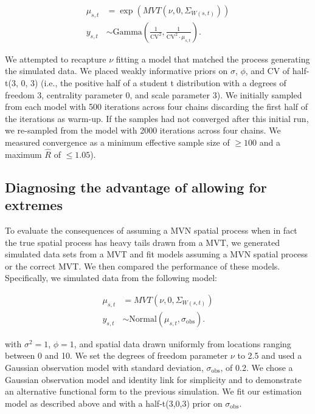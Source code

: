 \documentclass[12pt,english]{article}
\begin{document}
\begin{spacing}{1.25}
\begin{align}
  \mu_{s,t} &= \exp(MVT(\nu, 0, \Sigma_{W(s,t)}))\\
  y_{s,t} &\sim \mathrm{Gamma} \left( \frac{1}{\mathrm{CV}^2},
  \frac{1}{\mathrm{CV}^2 \cdot \mu_{s,t} } \right).
\end{align}

We attempted to recapture $\nu$ fitting a model that matched the process
generating the simulated data. We placed weakly informative priors on $\sigma$,
$\phi$, and CV of half-t(3, 0, 3) (i.e., the positive half of a student t
distribution with a degrees of freedom 3, centrality parameter 0, and scale
parameter 3). We initially sampled from each model with 500 iterations across
four chains discarding the first half of the iterations as warm-up. If the
samples had not converged after this initial run, we re-sampled from the model
with 2000 iterations across four chains. We measured convergence as a minimum
effective sample size of $\ge 100$ and a maximum $\hat{R}$ of $\le 1.05$). 

\subsection{Diagnosing the advantage of allowing for extremes}

To evaluate the consequences of assuming a MVN spatial process when in fact the
true spatial process has heavy tails drawn from a MVT, we generated simulated
data sets from a MVT and fit models assuming a MVN spatial process or the
correct MVT. We then compared the performance of these models. Specifically, we
simulated data from the following model:

\begin{align}
  \mu_{s,t} &= MVT(\nu, 0, \Sigma_{W(s,t)})\\
  y_{s,t} &\sim \mathrm{Normal} \left(\mu_{s,t}, \sigma_{\mathrm{obs}} \right).
\end{align}

\noindent with $\sigma^2 = 1$, $\phi = 1$, and spatial data drawn uniformly
from locations ranging between 0 and 10. We set the degrees of freedom
parameter $\nu$ to 2.5 and used a Gaussian observation model with standard
deviation, $\sigma_{\mathrm{obs}}$, of 0.2. We chose a Gaussian observation
model and identity link for simplicity and to demonstrate an alternative
functional form to the previous simulation. We fit our estimation model as
described above and with a half-t(3,0,3) prior on $\sigma_{\mathrm{obs}}$.


\end{spacing}
\end{document}
